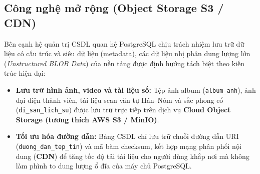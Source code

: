 \subsection{Công nghệ mở rộng (Object Storage S3 / CDN)}

Bên cạnh hệ quản trị CSDL quan hệ PostgreSQL chịu trách nhiệm lưu trữ dữ liệu có cấu trúc và siêu dữ liệu (metadata), các dữ liệu nhị phân dung lượng lớn (\textit{Unstructured BLOB Data}) của nền tảng được định hướng tách biệt theo kiến trúc hiện đại:
\begin{itemize}
    \item \textbf{Lưu trữ hình ảnh, video và tài liệu số:} Tệp ảnh album (\texttt{album\_anh}), ảnh đại diện thành viên, tài liệu scan văn tự Hán--Nôm và sắc phong cổ (\texttt{di\_san\_lich\_su}) được lưu trữ trực tiếp trên dịch vụ \textbf{Cloud Object Storage (tương thích AWS S3 / MinIO)}.
    \item \textbf{Tối ưu hóa đường dẫn:} Bảng CSDL chỉ lưu trữ chuỗi đường dẫn URI (\texttt{duong\_dan\_tep\_tin}) và mã băm checksum, kết hợp mạng phân phối nội dung (\textbf{CDN}) để tăng tốc độ tải tài liệu cho người dùng khắp nơi mà không làm phình to dung lượng ổ đĩa của máy chủ PostgreSQL.
\end{itemize}
